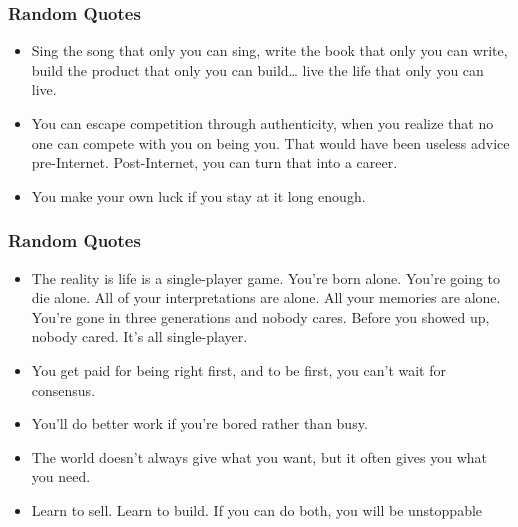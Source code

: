 \begin{frame}[fragile]\frametitle{ Random Quotes}

\begin{itemize}
\item Sing the song that only you can sing, write the book that only you can
write, build the product that only you can build… live the life that only
you can live.

\item You can escape competition through authenticity, when you realize
that no one can compete with you on being you. That would have
been useless advice pre-Internet. Post-Internet, you can turn that into
a career.

\item You make your own luck if you stay at it long enough.
\end{itemize}

\end{frame}

\begin{frame}[fragile]\frametitle{ Random Quotes}

\begin{itemize}
\item The reality is life is a single-player game. You’re born alone. You’re
going to die alone. All of your interpretations are alone. All your
memories are alone. You’re gone in three generations and nobody
cares. Before you showed up, nobody cared. It’s all single-player.

\item You get paid for being right  first, and to be  first, you can’t wait for
consensus.

\item You’ll do better work if you’re bored rather than busy.

\item The world doesn’t always give what you want, but it often gives you
what you need.

\item Learn to sell. Learn to build. If you can do both, you will be
unstoppable
\end{itemize}

\end{frame}


